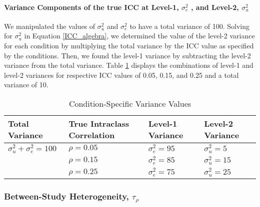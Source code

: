 \paragraph{Variance Components of the true ICC at Level-1, \texorpdfstring{$\sigma^2_e$}{s2e} , and Level-2, \texorpdfstring{$\sigma^2_u$}{s2u} }
We manipulated the values of $\sigma^2_u$ and $\sigma^2_e$ to have a total variance of 100. 
Solving for $\sigma^2_u$ in Equation \ref{ICC_algebra}, we determined the value of the level-2 variance for each condition by multiplying the total variance by the ICC value as specified by the conditions. Then, we found the level-1 variance by subtracting the level-2 variance from the total variance. Table \ref{table:varvalues} displays the combinations of level-1 and level-2 variances for respective ICC values of  0.05, 0.15, and 0.25 and a total variance of 10. 



\begin{table}[!h]
\caption{Condition-Specific Variance Values}
\begin{tabular}{llll}
\toprule
Total Variance                            & True Intraclass Correlation             & Level-1 Variance                           & Level-2 Variance \\ 
\midrule

$\sigma^2_u + \sigma^2_e = 100$                  & $\rho = 0.05$                             & $\sigma^2_e = 95$                               & $\sigma^2_u = 5$       \\
                                          & $\rho = 0.15$                             & $\sigma^2_e = 85$                               & $\sigma^2_u = 15$      \\
                                          & $\rho = 0.25$                             & $\sigma^2_e = 75$                               & $\sigma^2_u = 25$      \\
\bottomrule
\end{tabular}
\label{table:varvalues}
\end{table}

\subsubsection{Between-Study Heterogeneity, \texorpdfstring{$\tau_{\rho}$}{tr} } \label{between-study}

